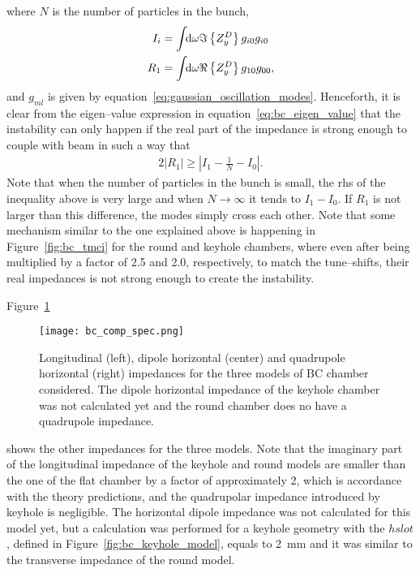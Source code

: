      where $N$ is the number of particles in the bunch,
     \begin{subequations}
         \begin{align}
             I_i &= \int\!\!\text{d}\omega \Im\left\{Z^D_y\right\}g_{i0}g_{i0} \\
             R_1 &= \int\!\!\text{d}\omega \Re\left\{Z^D_y\right\}g_{10}g_{00},
         \end{align}
     \end{subequations}
     and $g_{ml}$ is given by equation~\eqref{eq:gaussian_oscillation_modes}. Henceforth, it is clear from the eigen--value expression in equation~\eqref{eq:bc_eigen_value} that the instability can only happen if the real part of the impedance is strong enough to couple with beam in such a way that
     \begin{align}
         2|R_1| \ge \left| I_1 - \frac1N - I_0 \right|.
     \end{align}
     Note that when the number of particles in the bunch is small, the \gls{rhs} of the inequality above is very large and when $N\to\infty$ it tends to $I_1-I_0$. If $R_1$ is not larger than this difference, the modes simply cross each other. Note that some mechanism similar to the one explained above is happening in Figure~\ref{fig:bc_tmci} for the round and keyhole chambers, where even after being multiplied by a factor of 2.5 and 2.0, respectively, to match the tune--shifts, their real impedances is not strong enough to create the instability.

     Figure~\ref{fig:bc_comp_spec}
     \begin{figure}[t]
         \centering
         \texttt{[image: bc\_comp\_spec.png]}
         \caption[Comparison of impedances of different models of BC chamber.]{Longitudinal (left), dipole horizontal (center) and quadrupole horizontal (right) impedances for the three models of BC chamber considered. The dipole horizontal impedance of the keyhole chamber was not calculated yet and the round chamber does no have a quadrupole impedance.}
         \label{fig:bc_comp_spec}
     \end{figure}
     shows the other impedances for the three models. Note that the imaginary part of the longitudinal impedance of the keyhole and round models are smaller than the one of the flat chamber by a factor of approximately 2, which is accordance with the theory predictions, and the quadrupolar impedance introduced by keyhole is negligible. The horizontal dipole impedance was not calculated for this model yet, but a calculation was performed for a keyhole geometry with the $hslot$, defined in Figure~\ref{fig:bc_keyhole_model}, equals to \SI{2}{\milli\meter} and it was similar to the transverse impedance of the round model.

